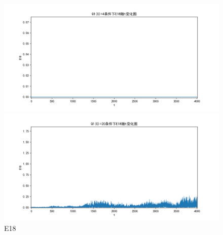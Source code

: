 \documentclass[10pt, a4paper]{article}
\begin{document}
    \begin{figure}[H]
        \begin{minipage}[t]{0.49\textwidth}
            \centering
            \includegraphics[width=\textwidth]{./q5_pics/cmp/E18.png}
        \end{minipage}
        \begin{minipage}[t]{0.49\textwidth}
            \centering
            \includegraphics[width=\textwidth]{./q5_pics/exp/E18.png}
        \end{minipage}
        \caption{E18}\label{fig:E18 in q5}
    \end{figure}
\end{document}
